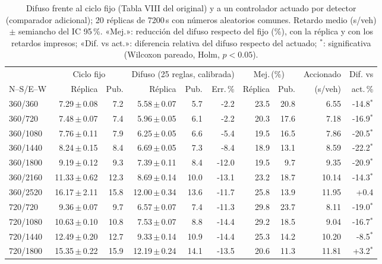 \begin{table}[!t]
\caption{Difuso frente al ciclo fijo (Tabla VIII del original) y a un controlador actuado por detector (comparador adicional); 20 réplicas de 7200\,s con números aleatorios comunes. Retardo medio (s/veh) $\pm$ semiancho del IC 95\,\%. «Mej.»: reducción del difuso respecto del fijo (\%), con la réplica y con los retardos impresos; «Dif. vs act.»: diferencia relativa del difuso respecto del actuado; $^{*}$: significativa (Wilcoxon pareado, Holm, $p<0.05$).}
\label{tab:tabla8}
\centering
\footnotesize
\setlength{\tabcolsep}{3.2pt}
\begin{tabular}{@{}lrrrrrrrrr@{}}
\toprule
 & \multicolumn{2}{c}{Ciclo fijo} & \multicolumn{3}{c}{Difuso (25 reglas, calibrada)} & \multicolumn{2}{c}{Mej.\,(\%)} & Accionado & Dif. vs \\
\cmidrule(lr){2-3}\cmidrule(lr){4-6}\cmidrule(lr){7-8}
N--S/E--W & Réplica & Pub. & Réplica & Pub. & Err.\,\% & Réplica & Pub. & (s/veh) & act.\,\% \\
\midrule
360/360 & 7.29\,$\pm$\,0.08 & 7.2 & 5.58\,$\pm$\,0.07 & 5.7 & -2.2 & 23.5 & 20.8 & 6.55 & -14.8$^{*}$ \\
360/720 & 7.48\,$\pm$\,0.07 & 7.4 & 5.96\,$\pm$\,0.05 & 6.1 & -2.2 & 20.3 & 17.6 & 7.18 & -16.9$^{*}$ \\
360/1080 & 7.76\,$\pm$\,0.11 & 7.9 & 6.25\,$\pm$\,0.05 & 6.6 & -5.4 & 19.5 & 16.5 & 7.86 & -20.5$^{*}$ \\
360/1440 & 8.24\,$\pm$\,0.15 & 8.4 & 6.69\,$\pm$\,0.05 & 7.3 & -8.4 & 18.9 & 13.1 & 8.59 & -22.2$^{*}$ \\
360/1800 & 9.19\,$\pm$\,0.12 & 9.3 & 7.39\,$\pm$\,0.11 & 8.4 & -12.0 & 19.5 & 9.7 & 9.35 & -20.9$^{*}$ \\
360/2160 & 11.33\,$\pm$\,0.62 & 12.3 & 8.69\,$\pm$\,0.14 & 10.0 & -13.1 & 23.2 & 18.7 & 10.14 & -14.3$^{*}$ \\
360/2520 & 16.17\,$\pm$\,2.11 & 15.8 & 12.00\,$\pm$\,0.34 & 13.6 & -11.7 & 25.8 & 13.9 & 11.95 & +0.4 \\
720/720 & 9.36\,$\pm$\,0.07 & 9.7 & 6.57\,$\pm$\,0.07 & 7.4 & -11.3 & 29.8 & 23.7 & 8.11 & -19.0$^{*}$ \\
720/1080 & 10.63\,$\pm$\,0.10 & 10.8 & 7.53\,$\pm$\,0.07 & 8.8 & -14.4 & 29.2 & 18.5 & 9.04 & -16.7$^{*}$ \\
720/1440 & 12.49\,$\pm$\,0.20 & 12.7 & 9.33\,$\pm$\,0.14 & 10.9 & -14.4 & 25.3 & 14.2 & 10.20 & -8.5$^{*}$ \\
720/1800 & 15.35\,$\pm$\,0.22 & 15.9 & 12.19\,$\pm$\,0.24 & 14.1 & -13.5 & 20.6 & 11.3 & 11.81 & +3.2$^{*}$ \\

\end{tabular}
\end{table}
